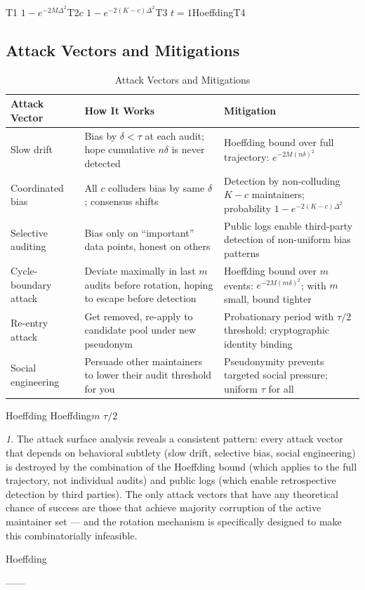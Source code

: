 \documentclass[12pt,a4paper]{article}
\theoremstyle{remark}
\newtheorem{govnote}{}[section]
\newenvironment{govbox}{%
  \begin{center}
  \color{blue}
  \begin{minipage}{0.92\textwidth}
  \begin{govnote}
}{%
  \end{govnote}
  \end{minipage}
  \end{center}
}
\begin{document}
\noindent\textbf{}
T1
$1 - e^{-2M\Delta^2}$T2$c$
$1 - e^{-2(K-c)\Delta^2}$T3
$t=1$HoeffdingT4

\subsection{Attack Vectors and Mitigations}

\begin{table}[H]
\centering
\caption{Attack Vectors and Mitigations}
\label{tab:attacks}
\begin{tabular}{@{}p{3.5cm}p{4.5cm}p{4.5cm}@{}}
\toprule
\textbf{Attack Vector} & \textbf{How It Works} & \textbf{Mitigation} \\
\midrule
Slow drift & Bias by $\delta < \tau$ at each audit; hope cumulative $n\delta$ is never detected & Hoeffding bound over full trajectory: $e^{-2M(n\delta)^2}$ \\
\midrule
Coordinated bias & All $c$ colluders bias by same $\delta$; consensus shifts & Detection by non-colluding $K-c$ maintainers; probability $1 - e^{-2(K-c)\Delta^2}$ \\
\midrule
Selective auditing & Bias only on ``important'' data points, honest on others & Public logs enable third-party detection of non-uniform bias patterns \\
\midrule
Cycle-boundary attack & Deviate maximally in last $m$ audits before rotation, hoping to escape before detection & Hoeffding bound over $m$ events: $e^{-2M(m\delta)^2}$; with $m$ small, bound tighter \\
\midrule
Re-entry attack & Get removed, re-apply to candidate pool under new pseudonym & Probationary period with $\tau/2$ threshold; cryptographic identity binding \\
\midrule
Social engineering & Persuade other maintainers to lower their audit threshold for you & Pseudonymity prevents targeted social pressure; uniform $\tau$ for all \\
\bottomrule
\end{tabular}
\end{table}

\noindent\textbf{}
Hoeffding
Hoeffding$m$
$\tau/2$

\begin{govbox}
The attack surface analysis reveals a consistent pattern: every attack vector
that depends on behavioral subtlety (slow drift, selective bias, social
engineering) is destroyed by the combination of the Hoeffding bound (which
applies to the full trajectory, not individual audits) and public logs (which
enable retrospective detection by third parties). The only attack vectors that
have any theoretical chance of success are those that achieve majority
corruption of the active maintainer set — and the rotation mechanism is
specifically designed to make this combinatorially infeasible.

\begin{center}
\small\textbf{}

Hoeffding

——
\end{center}
\end{govbox}
\end{document}
